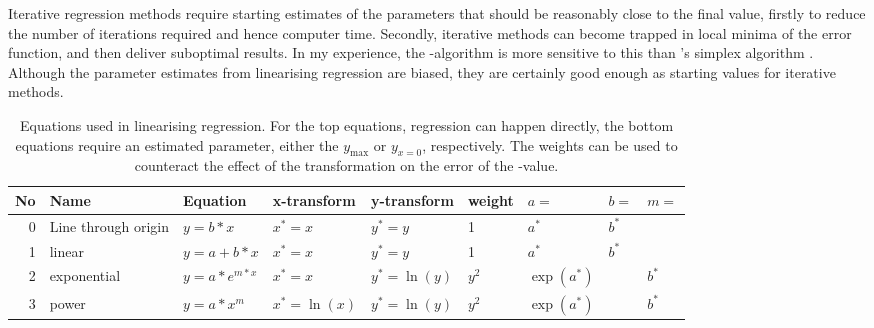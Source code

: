 \begin{refsection}
Iterative regression methods require starting estimates of the parameters that should be reasonably close to the final value, firstly to reduce the number of iterations required and hence computer time. Secondly, iterative methods can become trapped in local minima of the error function, and then deliver suboptimal results. In my experience, the -algorithm \parencite{Lev-44,Mar-63} is more sensitive to this than 's simplex algorithm \parencite{Nel-65,Cac-84,Kim-97}. Although the parameter estimates from linearising regression are biased, they are certainly good enough as starting values for iterative methods.

\begin{table}
 \caption{Equations used in linearising regression. For the top equations, regression can happen directly, the bottom equations require an estimated parameter, either the \(y_\mathrm{max} \) or \(y_{x=0} \), respectively. The weights can be used to counteract the effect of the transformation on the error of the -value.}
 \label{tab:linearise}
 \centering
 \begin{tabular}{rllllllll}
 \toprule
 No & Name                & Equation             & x-transform         & y-transform                                 & weight                                                    & \(a = \)            & \(b = \)       & \(m = \)  \\
 \midrule
  0 & Line through origin & \(y=b*x \)              & \(x^* = x \)            & \(y^* = y \)                                  & 1                                                         & \(a^* \)            & \(b^* \)       &        \\
  1 & linear              & \(y=a + b*x \)          & \(x^* = x \)            & \(y^* = y \)                                  & 1                                                         & \(a^* \)            & \(b^* \)       &        \\
  2 & exponential         & \(y=a*e^{m*x} \)        & \(x^* = x \)            & \(y^* = \ln(y) \)                             & \(y^2 \)                                                     & \(\exp(a^*) \)      &             & \(b^* \)  \\
  3 & power               & \(y=a*x^m \)            & \(x^* = \ln(x) \)       & \(y^* = \ln(y) \)                             & \(y^2 \)                                                     & \(\exp(a^*) \)      &             & \(b^* \)  \\

\end{tabular}
\end{table}
\end{refsection}

